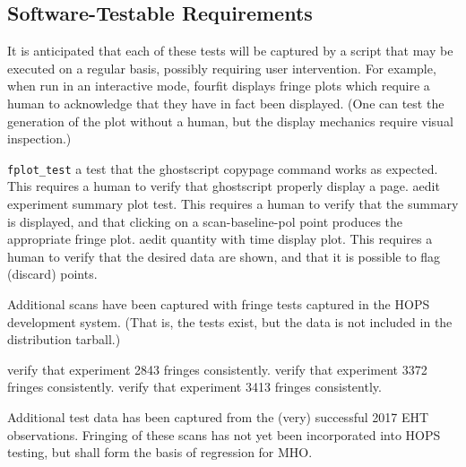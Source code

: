 \subsection{Software-Testable Requirements}
\label{sec:regress}

It is anticipated that each of these tests will be captured by a
script that may be executed on a regular basis, possibly requiring
user intervention.  For example, when run in an interactive mode,
\ac{fourfit} displays fringe plots which require a human to acknowledge
that they have in fact been displayed.  (One can test the generation of
the plot without a human, but the display mechanics require visual
inspection.)

\begin{description}
 \texttt{fplot\_test} a test that the \ac{ghostscript} copypage
    command works as expected.  This requires a human to verify that
    \ac{ghostscript} properly display a page.
 \ac{aedit} experiment summary plot test.  This requires a
    human to verify that the summary is displayed, and that clicking
    on a scan-baseline-pol point produces the appropriate fringe plot.
 \ac{aedit} quantity with time display plot.  This requires
    a human to verify that the desired data are shown, and that it
    is possible to flag (discard) points.
 
\end{description}

Additional scans have been captured with fringe tests captured
in the \ac{HOPS} development system.  (That is, the tests exist,
but the data is not included in the distribution tarball.)

\begin{description}
 verify that experiment 2843 fringes consistently.
 verify that experiment 3372 fringes consistently.
 verify that experiment 3413 fringes consistently.
\end{description}

Additional test data has been captured from the (very) successful
2017 \ac{EHT} observations.  Fringing of these scans has not yet
been incorporated into \ac{HOPS} testing, but shall form the basis
of regression for \ac{MHO}.  \FIXME[elaborate]

